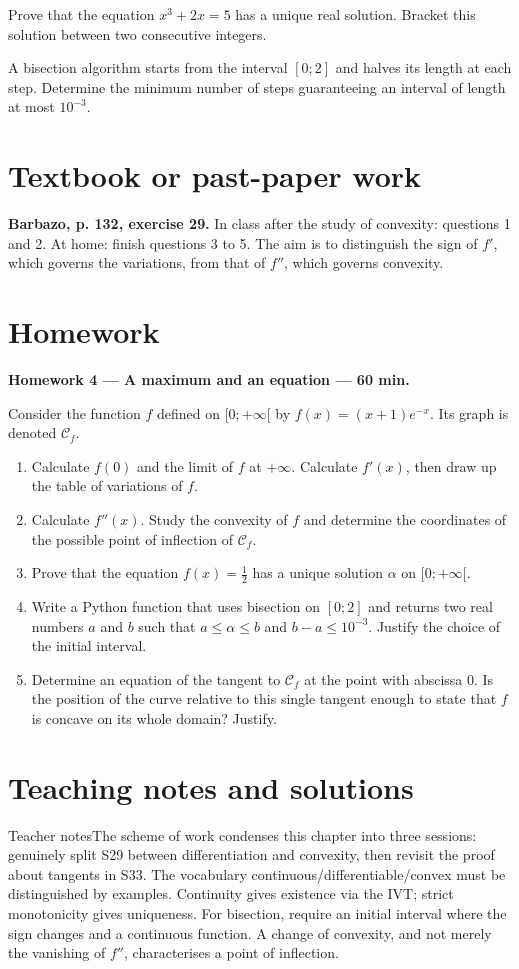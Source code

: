 Prove that the equation $x^3+2x=5$ has a unique real solution. Bracket this solution between two consecutive integers.

A bisection algorithm starts from the interval $[0;2]$ and halves its length at each step. Determine the minimum number of steps guaranteeing an interval of length at most $10^{-3}$.

\section{Textbook or past-paper work}\textbf{Barbazo, p. 132, exercise 29.} In class after the study of convexity: questions 1 and 2. At home: finish questions 3 to 5. The aim is to distinguish the sign of $f'$, which governs the variations, from that of $f''$, which governs convexity.

\section{Homework}\textbf{Homework 4 --- A maximum and an equation --- 60 min.}\par Consider the function $f$ defined on $[0;+\infty[$ by $f(x)=(x+1)e^{-x}$. Its graph is denoted $\mathcal C_f$.
\begin{enumerate}\item Calculate $f(0)$ and the limit of $f$ at $+\infty$. Calculate $f' (x)$, then draw up the table of variations of $f$.
\item Calculate $f'' (x)$. Study the convexity of $f$ and determine the coordinates of the possible point of inflection of $\mathcal C_f$.
\item Prove that the equation $f(x)=\frac12$ has a unique solution $\alpha$ on $[0;+\infty[$.
\item Write a Python function that uses bisection on $[0;2]$ and returns two real numbers $a$ and $b$ such that $a\le\alpha\le b$ and $b-a\le10^{-3}$. Justify the choice of the initial interval.
\item Determine an equation of the tangent to $\mathcal C_f$ at the point with abscissa $0$. Is the position of the curve relative to this single tangent enough to state that $f$ is concave on its whole domain? Justify.\end{enumerate}

\ifprof\clearpage\section{Teaching notes and solutions}\begin{profbox}{Teacher notes}The scheme of work condenses this chapter into three sessions: genuinely split S29 between differentiation and convexity, then revisit the proof about tangents in S33. The vocabulary continuous/differentiable/convex must be distinguished by examples. Continuity gives existence via the IVT; strict monotonicity gives uniqueness. For bisection, require an initial interval where the sign changes and a continuous function. A change of convexity, and not merely the vanishing of $f''$, characterises a point of inflection.\end{profbox}

